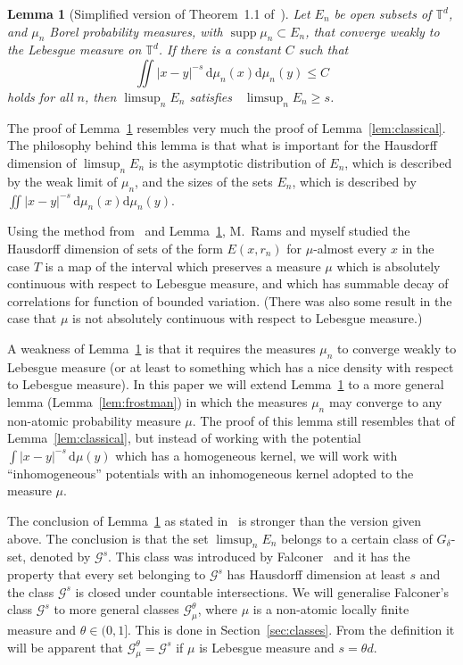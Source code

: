 \documentclass[10pt]{amsart}
\newtheorem{lemm}[theo]{Lemma}\newtheorem{prop}[theo]{Proposition}\newtheorem{coro}[theo]{Corollary}\newtheorem{conj}[theo]{Conjecture}
\theoremstyle{definition}\newtheorem{defi}[theo]{Definition}\newtheorem{rema}[theo]{Remark}\newtheorem{exam}[theo]{Example}\newtheorem{exem}[theo]{Example}\newtheorem{nota}[theo]{Notation}
\DeclareMathOperator{\dimh}{dim_H}
\DeclareMathOperator{\supp}{supp}
\newcommand*{\dd}{\mathrm{d}}
\begin{document}
\begin{lemm}[Simplified version of Theorem~1.1 of~\cite{perssonreeve}] \label{lem:perssonreeve}
Let $E_n$ be open subsets of\/ $\mathbb{T}^d$, and $\mu_n$ Borel probability measures, with $\supp \mu_n \subset E_n$, that converge weakly to the Lebesgue measure on $\mathbb{T}^d$. If there is a constant $C$ such that
\begin{equation}\label{eq:bounded_energy}
\iint |x - y|^{-s} \, \dd \mu_n (x) \dd \mu_n (y)
\leq C
\end{equation}
holds for all $n$, then $\limsup_n E_n$ satisfies $\dimh \limsup_n E_n \geq s$.
\end{lemm}

The proof of Lemma~\ref{lem:perssonreeve} resembles very much the proof of Lemma~\ref{lem:classical}. The philosophy behind this lemma is that what is important for the Hausdorff dimension of $\limsup_n E_n$ is the asymptotic distribution of $E_n$, which is described by the weak limit of $\mu_n$, and the sizes of the sets $E_n$, which is described by $\iint |x-y|^{-s} \, \dd\mu_n (x) \dd\mu_n (y)$.

Using the method from~\cite{persson} and Lemma~\ref{lem:perssonreeve}, M.~Rams and myself studied the Hausdorff dimension of sets of the form $E(x,r_n)$ for $\mu$-almost every $x$ in the case $T$ is a map of the interval which preserves a measure $\mu$ which is absolutely continuous with respect to Lebesgue measure, and which has summable decay of correlations for function of bounded variation. (There was also some result in the case that $\mu$ is not absolutely continuous with respect to Lebesgue measure.)

A weakness of Lemma~\ref{lem:perssonreeve} is that it requires the measures $\mu_n$ to converge weakly to Lebesgue measure (or at least to something which has a nice density with respect to Lebesgue measure). In this paper we will extend Lemma~\ref{lem:perssonreeve} to a more general lemma (Lemma~\ref{lem:frostman}) in which the measures $\mu_n$ may converge to any non-atomic probability measure $\mu$. The proof of this lemma still resembles that of Lemma~\ref{lem:classical}, but instead of working with the potential $\int |x-y|^{-s} \,
\dd\mu (y)$ which has a homogeneous kernel, we will work with ``inhomogeneous'' potentials with an inhomogeneous kernel adopted to the measure $\mu$.

The conclusion of Lemma~\ref{lem:perssonreeve} as stated in~\cite{perssonreeve} is stronger than the version given above. The conclusion is that the set $\limsup_n E_n$ belongs to a certain class of $G_\delta$-set, denoted by $\mathscr{G}^s$. This class was introduced by Falconer~\cite{falconer1, falconer2} and it has the property that every set belonging to $\mathscr{G}^s$ has Hausdorff dimension at least $s$ and the class $\mathscr{G}^s$ is closed under countable intersections. We will generalise Falconer's class $\mathscr{G}^s$ to more general classes $\mathscr{G}_\mu^\theta$, where $\mu$ is a non-atomic locally finite measure and $\theta \in (0,1]$. This is done in Section~\ref{sec:classes}. From the definition it will be apparent that $\mathscr{G}_\mu^\theta =
\mathscr{G}^s$ if $\mu$ is Lebesgue measure and $s = \theta d$.
\end{document}
